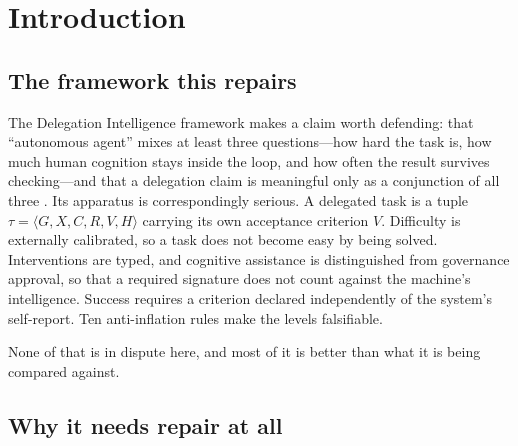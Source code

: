 \documentclass[11pt]{article}
\theoremstyle{definition}
\newcommand{\Td}{\ensuremath{T_\delta}}
\begin{document}
\begin{abstract}
\textbf{Its load metric is defined by an unobservable.} HCIL's denominator is the total cognitive effort a completed task \emph{required}---a counterfactual. We replace it with $L=r(\tau)(\Td+c_i)$, every term of which is a timestamp, and observe that the intervention scale is invariant to authorization latency, which in deployment dominates the cost.

We give the repaired reporting form, an episode record that carries it, and falsification conditions. Where the framework is better than the task-property account it is compared against---intervention depth, the cognitive/governance split, the acceptance criterion inside the task tuple, and delegation compression---we say so and adopt it.
\end{abstract}

\tableofcontents
\bigskip

\section{Introduction}

\subsection{The framework this repairs}

The Delegation Intelligence framework makes a claim worth defending: that ``autonomous agent'' mixes at least three questions---how hard the task is, how much human cognition stays inside the loop, and how often the result survives checking---and that a delegation claim is meaningful only as a conjunction of all three \citep{yang2026delegation}. Its apparatus is correspondingly serious. A delegated task is a tuple $\tau=\langle G,X,C,R,V,H\rangle$ carrying its own acceptance criterion $V$. Difficulty is externally calibrated, so a task does not become easy by being solved. Interventions are typed, and cognitive assistance is distinguished from governance approval, so that a required signature does not count against the machine's intelligence. Success requires a criterion declared independently of the system's self-report. Ten anti-inflation rules make the levels falsifiable.

None of that is in dispute here, and most of it is better than what it is being compared against.

\subsection{Why it needs repair at all}
\end{document}
